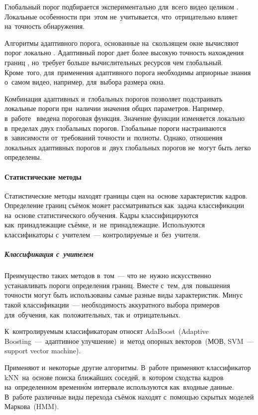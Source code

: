 Глобальный порог подбирается экспериментально
для~всего видео целиком \cite{Cernekova:2006}.
Локальные особенности при~этом не~учитывается,
что~отрицательно влияет на~точность обнаружения.

Алгоритмы адаптивного порога,
основанные на~скользящем окне вычисляют порог локально
\cite{Hoi:2006} \cite{Wu:2008}.
Адаптивный порог дает более высокую точность
нахождения границ \cite{Hanjalic:2002}, но~требует больше
вычислительных ресурсов чем глобальный.
Кроме~того, для~применения адаптивного порога необходимы априорные знания
о~самом видео, например, для~выбора размера окна.

Комбинация адаптивных и~глобальных порогов позволяет
подстраивать локальные пороги при~наличии значения общих параметров.
Например, в~работе~\cite{Quenot:2003} введена пороговая функция.
Значение функции изменяется локально в~пределах двух глобальных порогов.
Глобальные пороги настраиваются в~зависимости
от~требований точности и~полноты.
Однако, отношения локальных адаптивных порогов
и~двух глобальных порогов не~могут быть легко определены.

\paragraph{Статистические методы}

Статистические методы находят границы сцен на~основе характеристик кадров.
Определение границ съёмок может рассматриваться как~задача классификации
на~основе статистического обучения. Кадры классифицируются
как~принадлежащие съёмке, и~не~принадлежащие.
Используются классификаторы с~учителем~— контролируемые и~без~учителя.

\subparagraph{Классификация  с~учителем}

Преимущество таких методов в~том~— что
не~нужно искусственно устанавливать пороги определения границ.
Вместе с~тем, для~повышения точности могут быть использованы
самые разные виды характеристик.
Минус такой классификации~— необходимость аккуратного
выбора примеров для~обучения,
как~положительных, так и~отрицательных.

К~контролируемым классификаторам относят AdaBoost\ (Adaptive
Boosting~—~адаптивное улучшение)\ и~метод
опорных векторов\ (МОВ,
SVM~—support vector machine).

Применяют и~некоторые другие алгоритмы.
В~работе  \cite{Cooper:2007} применяют классификатор
kNN\ на~основе поиска ближайших соседей,
в~котором сходства кадров на~определенном временно́м интервале используются
как~входные данные.
В~работе \cite{Boreczky:1998} различные виды перехода съёмок находят
с~помощью скрытых моделей Маркова\ (HMM).

